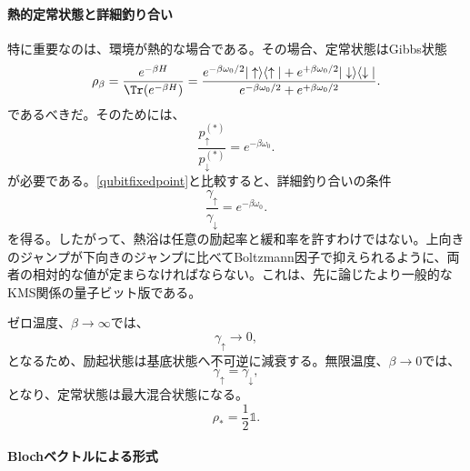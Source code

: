 \documentclass[a4paper,11pt,oneside]{article}
\theoremstyle{definition}
\numberwithin{equation}{section}
\begin{document}
\paragraph{熱的定常状態と詳細釣り合い}



特に重要なのは、環境が熱的な場合である。その場合、定常状態はGibbs状態
\begin{equation}
\rho_\beta
=
\frac{e^{-\beta H}}{\Tr(e^{-\beta H})}
=
\frac{e^{-\beta\omega_0/2}|\uparrow\rangle\langle\uparrow|
+
e^{+\beta\omega_0/2}|\downarrow\rangle\langle\downarrow|}
{e^{-\beta\omega_0/2}+e^{+\beta\omega_0/2}} .
\end{equation}
であるべきだ。そのためには、
\begin{equation}
\frac{p_\uparrow^{(\ast)}}{p_\downarrow^{(\ast)}}
=
e^{-\beta\omega_0} .
\end{equation}
が必要である。\eqref{qubitfixedpoint}と比較すると、詳細釣り合いの条件
\begin{equation}\label{qubitdetailedbalance}
\frac{\gamma_\uparrow}{\gamma_\downarrow}
=
e^{-\beta\omega_0} .
\end{equation}
を得る。したがって、熱浴は任意の励起率と緩和率を許すわけではない。上向きのジャンプが下向きのジャンプに比べてBoltzmann因子で抑えられるように、両者の相対的な値が定まらなければならない。これは、先に論じたより一般的なKMS関係の量子ビット版である。



ゼロ温度、$\beta\to\infty$では、
\begin{equation}
\gamma_\uparrow \to 0 ,
\end{equation}
となるため、励起状態は基底状態へ不可逆に減衰する。無限温度、$\beta\to 0$では、
\begin{equation}
\gamma_\uparrow = \gamma_\downarrow ,
\end{equation}
となり、定常状態は最大混合状態になる。
\begin{equation}
\rho_\ast = \frac12 \mathds{1}  .
\end{equation}




\paragraph{Blochベクトルによる形式}
\end{document}

